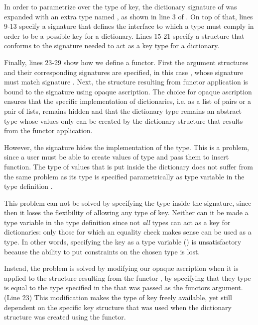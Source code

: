 \documentclass[10pt,a4paper,master=cws, masteroption=ai,english,inputenc=utf8]{kulemt}
\begin{document}
In order to parametrize over the type of key, the dictionary signature of  was expanded with an extra type named , as shown in line 3 of .
On top of that, lines 9-13 specify a signature  that defines the interface to which a type must comply in order to be a possible key for a dictionary.
Lines 15-21 specify a structure  that conforms to the signature needed to act as a key type for a dictionary.

Finally, lines 23-29 show how we define a functor.
First the argument structures and their corresponding signatures are specified, in this case , whose signature must match signature .
Next, the structure resulting from functor application is bound to the  signature using opaque ascription.
The choice for opaque ascription ensures that the specific implementation of dictionaries, i.e. as a list of pairs or a pair of lists, remains hidden and that the dictionary type remains an abstract type whose values only can be created by the dictionary structure that results from the functor application.

However, the signature  hides the implementation of the  type.
This is a problem, since a user must be able to create values of type  and pass them to insert function.
The type of values that is put inside the dictionary does not suffer from the same problem as its type is specified parametrically as type variable  in the type definition .

This problem can not be solved by specifying the type inside the  signature, since then it loses the flexibility of allowing any type of key.
Neither can it be made a type variable in the type definition  since not \emph{all} types can act as a key for dictionaries: only those for which an equality check makes sense can be used as a  type.
In other words, specifying the key as a type variable () is unsatisfactory because the ability to put constraints on the chosen type is lost.

Instead, the problem is solved by modifying our opaque ascription when it is applied to the structure resulting from the functor , by specifying that they  type is equal to the type  specified in the  that was passed as the functors argument. (Line 23)
This modification makes the type of key freely available, yet still dependent on the specific key structure that was used when the dictionary structure was created using the functor.
\end{document}
